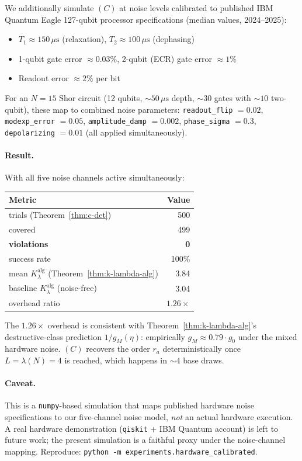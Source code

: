 \documentclass[11pt]{article}
\begin{document}
We additionally simulate $(C)$ at noise levels calibrated to published IBM Quantum Eagle 127-qubit processor specifications (median values, 2024--2025):
\begin{itemize}
  \item $T_1 \approx 150\,\mu\text{s}$ (relaxation), $T_2 \approx 100\,\mu\text{s}$ (dephasing)
  \item 1-qubit gate error $\approx 0.03\%$, 2-qubit (ECR) gate error $\approx 1\%$
  \item Readout error $\approx 2\%$ per bit
\end{itemize}

For an $N = 15$ Shor circuit (12 qubits, $\sim 50\,\mu\text{s}$ depth, $\sim 30$ gates with $\sim 10$ two-qubit), these map to combined noise parameters: \texttt{readout\_flip} $= 0.02$, \texttt{modexp\_error} $= 0.05$, \texttt{amplitude\_damp} $= 0.002$, \texttt{phase\_sigma} $= 0.3$, \texttt{depolarizing} $= 0.01$ (all applied simultaneously).

\paragraph{Result.} With all five noise channels active simultaneously:

\begin{center}
\begin{tabular}{lr}
\toprule
Metric & Value \\
\midrule
trials (Theorem~\ref{thm:c-det}) & 500 \\
covered & 499 \\
\textbf{violations} & \textbf{0} \\
success rate & 100\% \\
mean $K_\lambda^{\text{alg}}$ (Theorem~\ref{thm:k-lambda-alg}) & 3.84 \\
baseline $K_\lambda^{\text{alg}}$ (noise-free) & 3.04 \\
overhead ratio & $1.26\times$ \\
\bottomrule
\end{tabular}
\end{center}

The $1.26\times$ overhead is consistent with Theorem~\ref{thm:k-lambda-alg}'s destructive-class prediction $1/g_M(\eta)$: empirically $g_M \approx 0.79 \cdot g_0$ under the mixed hardware noise. $(C)$ recovers the order $r_a$ deterministically once $L = \lambda(N) = 4$ is reached, which happens in $\sim 4$ base draws.

\paragraph{Caveat.} This is a \texttt{numpy}-based simulation that maps published hardware noise specifications to our five-channel noise model, \emph{not} an actual hardware execution. A real hardware demonstration (\texttt{qiskit} + IBM Quantum account) is left to future work; the present simulation is a faithful proxy under the noise-channel mapping. Reproduce: \texttt{python -m experiments.hardware\_calibrated}.
\end{document}
